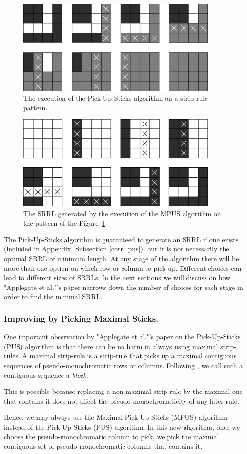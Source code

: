 \begin{figure}[h]
\centering
\includegraphics[width=10cm]{pick_up_sticks_example}
\caption{The execution of the Pick-Up-Sticks algorithm on a strip-rule pattern.}
\label{fig:pick_up_sticks_example}
\end{figure}

\begin{figure}[h]
\centering
\includegraphics[width=10cm]{pick_up_sticks_srrl}
\caption{The SRRL generated by the execution of the MPUS algorithm on the pattern of the Figure~\ref{fig:pick_up_sticks_example}}
\label{fig:pick_up_sticks_srrl}
\end{figure}

The Pick-Up-Sticks algorithm is guaranteed to generate an SRRL if one exists
\cite{ACJKLW07} (included in Appendix, Subsection \ref{corr_pus}), but it is not necessarily the optimal SRRL of minimum length. At any stage of the algorithm there will be more than one option on which row or column to pick up. Different choices can lead to different sizes of SRRLs. In the next sections we will discuss on how "Applegate et al."'s paper narrows down the number of choices for each stage in order to find the minimal SRRL.

\subsubsection{Improving by Picking Maximal Sticks.}

One important observation by "Applegate et al."'s paper on the Pick-Up-Sticks (PUS) algorithm is that there can be no harm in always using maximal strip-rules. A maximal strip-rule is a strip-rule that picks up a maximal contiguous sequences of pseudo-monochromatic rows or columns. Following \cite{ACJKLW07},
we call such a contiguous sequence a {\em block}.

This is possible because replacing a non-maximal strip-rule by the maximal one that contains it does not affect the pseudo-monochromaticity of any later rule.

Hence, we may always use the Maximal Pick-Up-Sticks (MPUS) algorithm instead of the Pick-Up-Sticks (PUS) algorithm. In this new algorithm, once we choose the pseudo-monochromatic column to pick, we pick the maximal contiguous set of pseudo-monochromatic columns that contains it.

